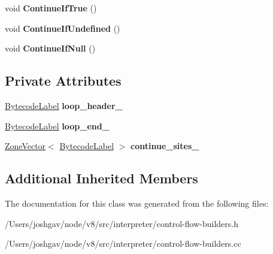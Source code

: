 \begin{DoxyCompactItemize}
\item 
void {\bfseries Continue\+If\+True} ()\hypertarget{classv8_1_1internal_1_1interpreter_1_1_loop_builder_a749df2c946ced601de8a5cd8aac000ff}{}\label{classv8_1_1internal_1_1interpreter_1_1_loop_builder_a749df2c946ced601de8a5cd8aac000ff}

\item 
void {\bfseries Continue\+If\+Undefined} ()\hypertarget{classv8_1_1internal_1_1interpreter_1_1_loop_builder_a0da593c562dfbcc5a0494e2dc4a053e9}{}\label{classv8_1_1internal_1_1interpreter_1_1_loop_builder_a0da593c562dfbcc5a0494e2dc4a053e9}

\item 
void {\bfseries Continue\+If\+Null} ()\hypertarget{classv8_1_1internal_1_1interpreter_1_1_loop_builder_a6e65fd77f0f67bf0dd741e0f72bcb3a4}{}\label{classv8_1_1internal_1_1interpreter_1_1_loop_builder_a6e65fd77f0f67bf0dd741e0f72bcb3a4}

\end{DoxyCompactItemize}
\subsection*{Private Attributes}
\begin{DoxyCompactItemize}
\item 
\hyperlink{classv8_1_1internal_1_1interpreter_1_1_bytecode_label}{Bytecode\+Label} {\bfseries loop\+\_\+header\+\_\+}\hypertarget{classv8_1_1internal_1_1interpreter_1_1_loop_builder_a2f686df1a2cf0e7730386017d4d84bbd}{}\label{classv8_1_1internal_1_1interpreter_1_1_loop_builder_a2f686df1a2cf0e7730386017d4d84bbd}

\item 
\hyperlink{classv8_1_1internal_1_1interpreter_1_1_bytecode_label}{Bytecode\+Label} {\bfseries loop\+\_\+end\+\_\+}\hypertarget{classv8_1_1internal_1_1interpreter_1_1_loop_builder_a4c1d2974e29c6967e984d40df839a97e}{}\label{classv8_1_1internal_1_1interpreter_1_1_loop_builder_a4c1d2974e29c6967e984d40df839a97e}

\item 
\hyperlink{classv8_1_1internal_1_1_zone_vector}{Zone\+Vector}$<$ \hyperlink{classv8_1_1internal_1_1interpreter_1_1_bytecode_label}{Bytecode\+Label} $>$ {\bfseries continue\+\_\+sites\+\_\+}\hypertarget{classv8_1_1internal_1_1interpreter_1_1_loop_builder_a609df9185a2346797324dcf973171d0a}{}\label{classv8_1_1internal_1_1interpreter_1_1_loop_builder_a609df9185a2346797324dcf973171d0a}

\end{DoxyCompactItemize}
\subsection*{Additional Inherited Members}


The documentation for this class was generated from the following files\+:\begin{DoxyCompactItemize}
\item 
/\+Users/joshgav/node/v8/src/interpreter/control-\/flow-\/builders.\+h\item 
/\+Users/joshgav/node/v8/src/interpreter/control-\/flow-\/builders.\+cc\end{DoxyCompactItemize}
